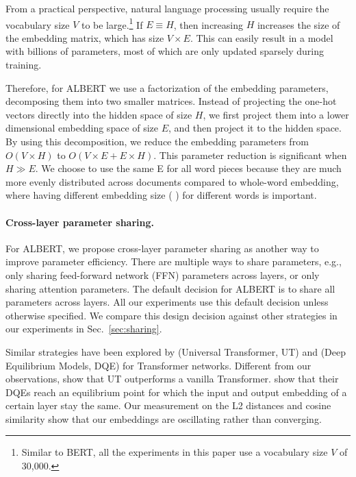 From a practical perspective, natural language processing usually require the vocabulary size $V$ to be large.\footnote{Similar to BERT, all the experiments in this paper use a vocabulary size $V$ of 30,000.} 
If $E\equiv H$, then increasing $H$ increases the size of the embedding matrix, which has size $V \times E$.
This can easily result in a model with billions of parameters, most of which are only updated sparsely during training. 

Therefore, for ALBERT we use a factorization of the embedding parameters, decomposing them into two smaller matrices.
Instead of projecting the one-hot vectors directly into the hidden space of size $H$, we first project them into a lower dimensional embedding space of size $E$, and then project it to the hidden space.
By using this decomposition, we reduce the embedding parameters from $O(V \times H)$  to $O(V \times E + E \times H)$.
This parameter reduction is significant when $H \gg E$. We choose to use the same E for all word pieces because they are much more evenly distributed across documents compared to whole-word embedding, where having different embedding size  (\cite{grave2017efficient, baevski2018adaptive,dai2019transformer} ) for different words is important.  


\paragraph{Cross-layer parameter sharing.}
For ALBERT, we propose cross-layer parameter sharing as another way to improve parameter efficiency.
There are multiple ways to share parameters, e.g., only sharing feed-forward network (FFN) parameters across layers, or only sharing attention parameters.
The default decision for ALBERT is to share all parameters across layers. All our experiments use this default decision unless otherwise specified.
We compare this design decision against other strategies in our experiments in Sec.~\ref{sec:sharing}.

Similar strategies have been explored by \cite{dehghani2018universal} (Universal Transformer, UT) and \cite{bai2019deep} (Deep Equilibrium Models, DQE) for Transformer networks.
Different from our observations, \cite{dehghani2018universal} show that UT outperforms a vanilla Transformer.
\cite{bai2019deep} show that their DQEs reach an equilibrium point for which the input and output embedding of a certain layer stay the same.
Our measurement on the L2 distances and cosine similarity show that our embeddings are oscillating rather than converging.


